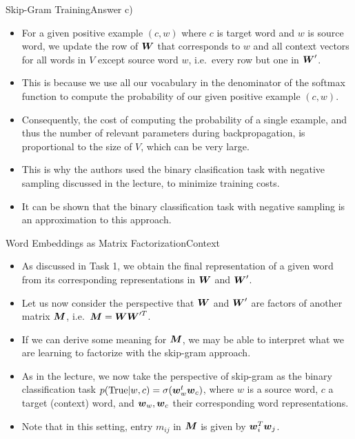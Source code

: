 \documentclass[t]{beamer}
\begin{document}
\begin{frame}{Skip-Gram Training}{Answer c)}
    \begin{itemize}
        \item For a given positive example $(c,w)$ where $c$ is target word and
              $w$ is source word, we update the row of ${\boldsymbol{W}}$ that corresponds to
              $w$ and all context vectors for all words in $V$ except source
              word $w$, i.e.\ every row but one in ${\boldsymbol{W}}'$.
        \item This is because we use all our vocabulary in the denominator of
              the softmax function to compute the probability of our given
              positive example $(c,w)$.
        \item Consequently, the cost of computing the probability of a single
              example, and thus the number of relevant parameters during
              backpropagation, is proportional to the size of $V$, which can be
              very large.
        \item This is why the authors used the binary clasification task with
              negative sampling discussed in the lecture, to minimize training
              costs.
        \item It can be shown that the binary classification task with negative
              sampling is an approximation to this approach.
    \end{itemize}
\end{frame}

\begin{frame}{Word Embeddings as Matrix Factorization}{Context}
    \begin{itemize}
        \item As discussed in Task 1, we obtain the final representation of a
              given word from its corresponding representations in ${\boldsymbol{W}}$ and
              ${\boldsymbol{W}}'$.
        \item Let us now consider the perspective that ${\boldsymbol{W}}$ and ${\boldsymbol{W}}'$ are
              factors of another matrix ${\boldsymbol{M}}$, i.e.\ ${\boldsymbol{M}} = {\boldsymbol{W}}{\boldsymbol{W}}'^T$.
        \item If we can derive some meaning for ${\boldsymbol{M}}$, we may be able to
              interpret what we are learning to factorize with the skip-gram
              approach.
        \item As in the lecture, we now take the perspective of skip-gram as the
              binary classification task
              $p(\text{True}|w,c) = \sigma({\boldsymbol{w}}_w^t{\boldsymbol{w}}_c)$, where $w$ is a source
              word, $c$ a target (context) word, and ${\boldsymbol{w}}_w,{\boldsymbol{w}}_c$ their
              corresponding word representations.
        \item Note that in this setting, entry $m_{ij}$ in ${\boldsymbol{M}}$ is given by
              ${\boldsymbol{w}}_i^T{\boldsymbol{w}}_j$.
    \end{itemize}
\end{frame}
\end{document}
